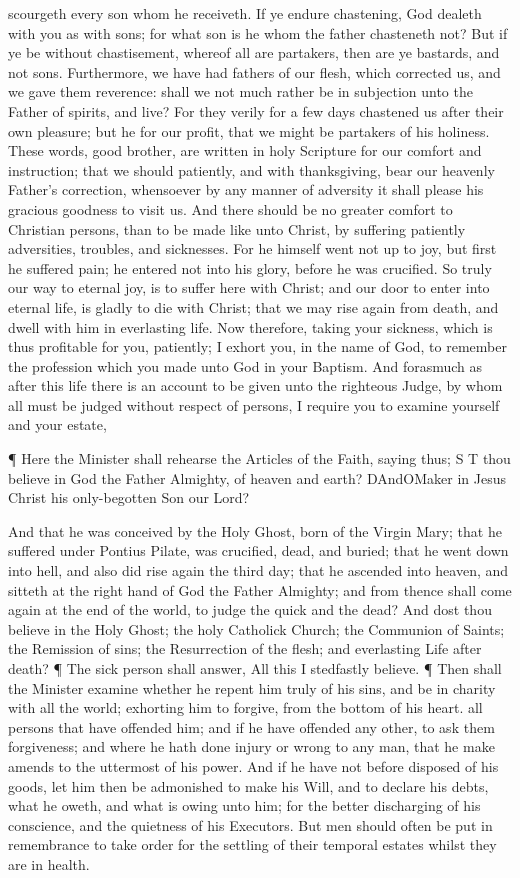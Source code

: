 scourgeth every son whom he receiveth. If ye endure chastening, God dealeth with you as with sons; for what son is he whom the father chasteneth not? But if ye be without chastisement, whereof all are partakers, then are ye bastards, and not sons. Furthermore, we have had fathers of our flesh, which corrected us, and we gave them reverence: shall we not much rather be in subjection unto the Father of spirits, and live? For they verily for a few days chastened us after their own pleasure; but he for our profit, that we might be partakers of his holiness. These words, good brother, are written in holy Scripture for our comfort and instruction; that we should patiently, and with thanksgiving, bear our heavenly Father’s correction, whensoever by any manner of adversity it shall please his gracious goodness to visit us. And there should be no greater comfort to Christian persons, than to be made like unto Christ, by suffering patiently adversities, troubles, and sicknesses. For he himself went not up to joy, but first he suffered pain; he entered not into his glory, before he was crucified. So truly our way to eternal joy, is to suffer here with Christ; and our door to enter into eternal life, is gladly to die with Christ; that we may rise again from death, and dwell with him in everlasting life. Now therefore, taking your sickness, which is thus profitable for you, patiently; I exhort you, in the name of God, to remember the profession which you made unto God in your Baptism. And forasmuch as after this life there is an account to be given unto the righteous Judge, by whom all must be judged without respect of persons, I require you to examine yourself and your estate,

¶ Here the Minister shall rehearse the Articles of the Faith, saying thus; S T thou believe in God the Father Almighty, of heaven and earth? DAndOMaker in Jesus Christ his only-begotten Son our Lord?

And that he was conceived by the Holy Ghost, born of the Virgin Mary; that he suffered under Pontius Pilate, was crucified, dead, and buried; that he went down into hell, and also did rise again the third day; that he ascended into heaven, and sitteth at the right hand of God the Father Almighty; and from thence shall come again at the end of the world, to judge the quick and the dead? And dost thou believe in the Holy Ghost; the holy Catholick Church; the Communion of Saints; the Remission of sins; the Resurrection of the flesh; and everlasting Life after death? ¶ The sick person shall answer, All this I stedfastly believe. ¶ Then shall the Minister examine whether he repent him truly of his sins, and be in charity with all the world; exhorting him to forgive, from the bottom of his heart. all persons that have offended him; and if he have offended any other, to ask them forgiveness; and where he hath done injury or wrong to any man, that he make amends to the uttermost of his power. And if he have not before disposed of his goods, let him then be admonished to make his Will, and to declare his debts, what he oweth, and what is owing unto him; for the better discharging of his conscience, and the quietness of his Executors. But men should often be put in remembrance to take order for the settling of their temporal estates whilst they are in health.

